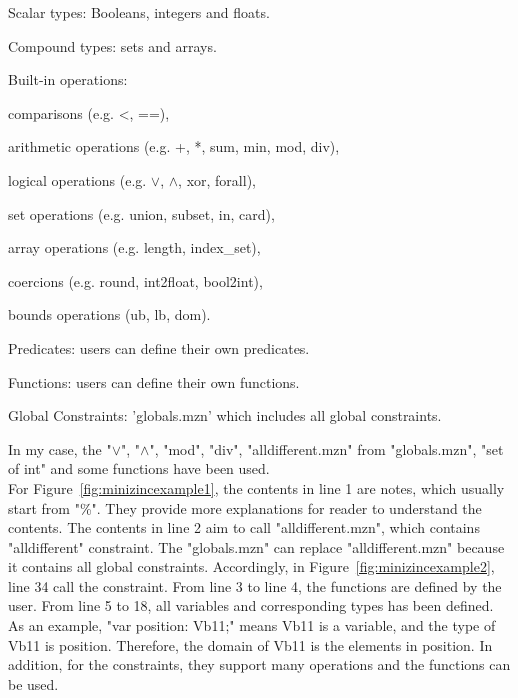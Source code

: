 \begin{compactenum}
  \item Scalar types: Booleans, integers and floats.
  \item Compound types: sets and arrays.
  \item Built-in operations: 
  \begin{compactitem}
  \item comparisons (e.g. <, ==),
  \item arithmetic operations (e.g. +, *, sum, min, mod, div),
  \item logical operations (e.g. $\vee$, $\wedge$, xor, forall),
  \item set operations (e.g. union, subset, in, card),
  \item array operations (e.g. length, index\_set),
  \item coercions (e.g. round, int2float, bool2int), 
  \item bounds operations (ub, lb, dom).
  \end{compactitem}
  \item Predicates: users can define their own predicates.
  \item Functions: users can define their own functions.
  \item Global Constraints: 'globals.mzn' which includes all global constraints.
\end{compactenum}
In my case, the "$\vee$", "$\wedge$", "mod", "div", "alldifferent.mzn" from "globals.mzn", "set of int" and some functions have been used.\\
For Figure~\ref{fig:minizincexample1}, the contents in line 1 are notes, which usually start from "\%". They provide more explanations for reader to understand the contents. The contents in line 2 aim to call "alldifferent.mzn", which contains "alldifferent" constraint. The "globals.mzn" can replace "alldifferent.mzn" because it contains all global constraints. Accordingly, in Figure~\ref{fig:minizincexample2}, line 34 call the constraint. From line 3 to line 4, the functions are defined by the user. From line 5 to 18, all variables and corresponding types has been defined. As an example, "var position: Vb11;" means Vb11 is a variable, and the type of Vb11 is position. Therefore, the domain of Vb11 is the elements in position. In addition, for the constraints, they support many operations and the functions can be used. 
